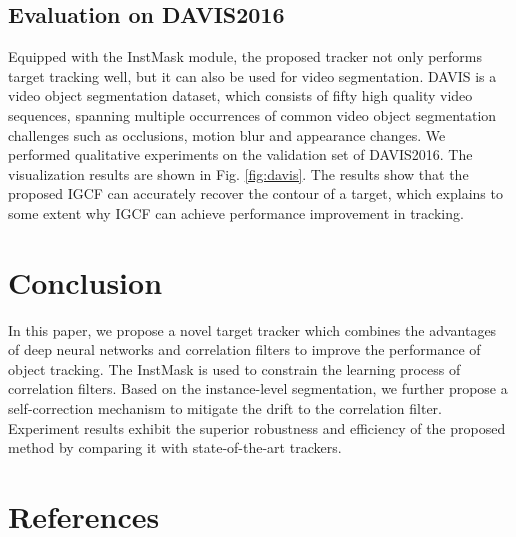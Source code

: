 \documentclass[review]{elsarticle}
\begin{document}
\begin{CJK*}{UTF8}{gbsn}
\subsection{Evaluation on DAVIS2016}
Equipped with the InstMask module, the proposed tracker not only performs target tracking well, but it can also be used for video segmentation. DAVIS \cite{Perazzi2016} is a video object segmentation dataset, which consists of fifty high quality video sequences, spanning multiple occurrences of common video object segmentation challenges such as occlusions, motion blur and appearance changes. We performed qualitative experiments on the validation set of DAVIS2016. The visualization results are shown in Fig. \ref{fig:davis}. The results show that the proposed IGCF can accurately recover the contour of a target, which explains to some extent why IGCF can achieve performance improvement in tracking.

\section{Conclusion}
In this paper, we propose a novel target tracker which combines the advantages of deep neural networks and correlation filters to improve the performance of object tracking.
The InstMask is used to constrain the learning process of correlation filters. Based on the instance-level segmentation, we further propose a self-correction mechanism to mitigate the drift to the correlation filter.
Experiment results exhibit the superior robustness and efficiency of the proposed method by comparing it with state-of-the-art trackers.

\end{CJK*}

\section*{References}


\end{document}
